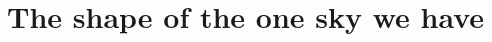 \providecommand{\BeChiNTwoFiveSix}{}\renewcommand{\BeChiNTwoFiveSix}{1.22}
\providecommand{\BeDofTwoFiveSix}{}\renewcommand{\BeDofTwoFiveSix}{24}
\providecommand{\BePerrTwoFiveSix}{}\renewcommand{\BePerrTwoFiveSix}{1.9}
\providecommand{\BePFiveOneTwo}{}\renewcommand{\BePFiveOneTwo}{33.3}
\providecommand{\BeChiNFiveOneTwo}{}\renewcommand{\BeChiNFiveOneTwo}{1.09}
\providecommand{\BeDofFiveOneTwo}{}\renewcommand{\BeDofFiveOneTwo}{24}
\providecommand{\BePerrFiveOneTwo}{}\renewcommand{\BePerrFiveOneTwo}{2.7}
\providecommand{\WdDataSixFour}{}\renewcommand{\WdDataSixFour}{47.2}
\providecommand{\WdSimSixFour}{}\renewcommand{\WdSimSixFour}{45.9}
\providecommand{\WdSdSixFour}{}\renewcommand{\WdSdSixFour}{4}
\providecommand{\WdPSixFour}{}\renewcommand{\WdPSixFour}{26.2}
\providecommand{\WdNtestSixFour}{}\renewcommand{\WdNtestSixFour}{400}
\providecommand{\WdNrefSixFour}{}\renewcommand{\WdNrefSixFour}{10}
\providecommand{\WdPtsDataSixFour}{}\renewcommand{\WdPtsDataSixFour}{484}
\providecommand{\WdPtsSimSixFour}{}\renewcommand{\WdPtsSimSixFour}{469}
\providecommand{\WdCutSixFour}{}\renewcommand{\WdCutSixFour}{0.1}
\providecommand{\WdDataOneTwoEight}{}\renewcommand{\WdDataOneTwoEight}{99.3}
\providecommand{\WdSimOneTwoEight}{}\renewcommand{\WdSimOneTwoEight}{99.6}
\providecommand{\WdSdOneTwoEight}{}\renewcommand{\WdSdOneTwoEight}{11.9}
\providecommand{\WdPOneTwoEight}{}\renewcommand{\WdPOneTwoEight}{35.5}
\providecommand{\WdNtestOneTwoEight}{}\renewcommand{\WdNtestOneTwoEight}{200}
\providecommand{\WdNrefOneTwoEight}{}\renewcommand{\WdNrefOneTwoEight}{5}
\providecommand{\WdPtsDataOneTwoEight}{}\renewcommand{\WdPtsDataOneTwoEight}{1016}
\providecommand{\WdPtsSimOneTwoEight}{}\renewcommand{\WdPtsSimOneTwoEight}{956}
\providecommand{\WdCutOneTwoEight}{}\renewcommand{\WdCutOneTwoEight}{0.5}
\providecommand{\WdExample}{}\renewcommand{\WdExample}{0.25}
\providecommand{\DualMaps}{}\renewcommand{\DualMaps}{20}
\providecommand{\DualCases}{}\renewcommand{\DualCases}{1220}
\providecommand{\DualBad}{}\renewcommand{\DualBad}{0}
\providecommand{\HzeroTimeFiveOneTwo}{}\renewcommand{\HzeroTimeFiveOneTwo}{1.01}
\section{The shape of the one sky we have}
\label{13b:sec:question}

